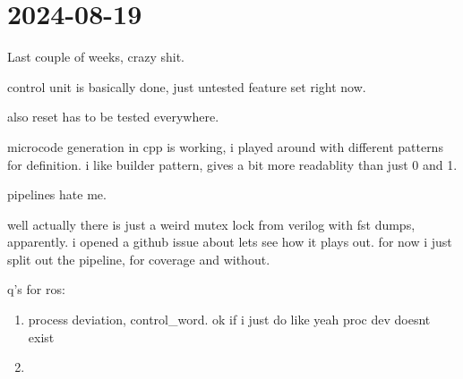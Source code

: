 \section{2024-08-19} %
\label{sec:2024-08-19}

Last couple of weeks, crazy shit. 

control unit is basically done, just untested feature set right now. 

also reset has to be tested everywhere. 

microcode generation in cpp is working, i played around with different patterns for definition. i like builder pattern, gives a bit more readablity than just 0 and 1. 

pipelines hate me. 

well actually there is just a weird mutex lock from verilog with fst dumps, apparently. i opened a github issue about lets see how it plays out. for now i just split out the pipeline, for coverage and without. 

q's for ros: 
\begin{enumerate}
  \item process deviation, control\_word. ok if i just do like yeah proc dev doesnt exist
  \item 
\end{enumerate}

